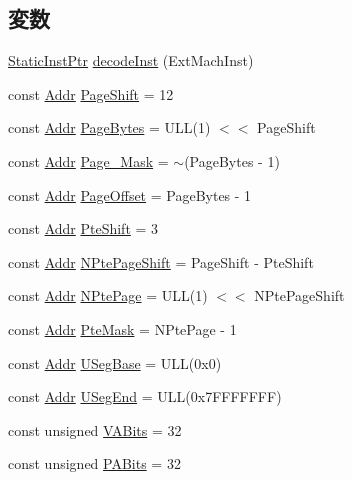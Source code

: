 \subsection*{変数}
\begin{DoxyCompactItemize}
\item 
\hyperlink{classRefCountingPtr}{StaticInstPtr} \hyperlink{namespaceArmISA_acff056b9dfcd05748ff37c6a69d9e854}{decodeInst} (ExtMachInst)
\item 
const \hyperlink{classm5_1_1params_1_1Addr}{Addr} \hyperlink{namespaceArmISA_a6eacddc1d6d191380d9afdac5920ea48}{PageShift} = 12
\item 
const \hyperlink{classm5_1_1params_1_1Addr}{Addr} \hyperlink{namespaceArmISA_ad9d6a4d965e107c9a7214f096107296b}{PageBytes} = ULL(1) $<$$<$ PageShift
\item 
const \hyperlink{classm5_1_1params_1_1Addr}{Addr} \hyperlink{namespaceArmISA_ac2d47d845cf48dbc176f717bb7d50a7f}{Page\_\-Mask} = $\sim$(PageBytes -\/ 1)
\item 
const \hyperlink{classm5_1_1params_1_1Addr}{Addr} \hyperlink{namespaceArmISA_a51e1064f1269394dc26702651be5061f}{PageOffset} = PageBytes -\/ 1
\item 
const \hyperlink{classm5_1_1params_1_1Addr}{Addr} \hyperlink{namespaceArmISA_af2c06ba3a5eb15cdac25d21b735b7161}{PteShift} = 3
\item 
const \hyperlink{classm5_1_1params_1_1Addr}{Addr} \hyperlink{namespaceArmISA_a9f060ccda225dfb28dff712695adab46}{NPtePageShift} = PageShift -\/ PteShift
\item 
const \hyperlink{classm5_1_1params_1_1Addr}{Addr} \hyperlink{namespaceArmISA_ae295358052b4e754e08cd5cd763c212a}{NPtePage} = ULL(1) $<$$<$ NPtePageShift
\item 
const \hyperlink{classm5_1_1params_1_1Addr}{Addr} \hyperlink{namespaceArmISA_a11ac2316fa90081132b648e36e4dd11b}{PteMask} = NPtePage -\/ 1
\item 
const \hyperlink{classm5_1_1params_1_1Addr}{Addr} \hyperlink{namespaceArmISA_a9d54e751f7acdb2ea3b820539047d085}{USegBase} = ULL(0x0)
\item 
const \hyperlink{classm5_1_1params_1_1Addr}{Addr} \hyperlink{namespaceArmISA_a42b44a1d23d813c474aef63cd9c7a729}{USegEnd} = ULL(0x7FFFFFFF)
\item 
const unsigned \hyperlink{namespaceArmISA_a10ace529e46442ee4127c149da6513af}{VABits} = 32
\item 
const unsigned \hyperlink{namespaceArmISA_a61386a9be90bc58024550fdbeb6ebaee}{PABits} = 32
\item 

\end{DoxyCompactItemize}
